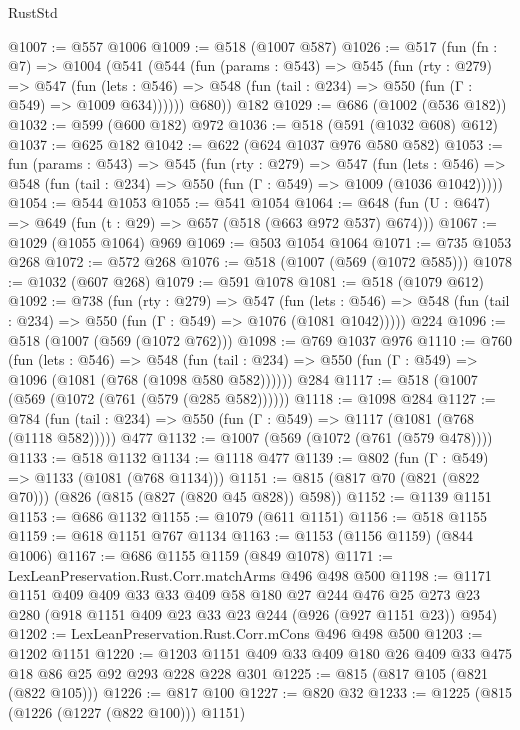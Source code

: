 \begin{lexlean}{RustStd}
\begin{coremodule}
@1007 := @557 @1006
@1009 := @518 (@1007 @587)
@1026 := @517
    (fun (fn : @7) =>
    @1004
      (@541
        (@544
          (fun (params : @543) =>
          @545
            (fun (rty : @279) =>
            @547
              (fun (lets : @546) =>
              @548 (fun (tail : @234) => @550 (fun (Γ : @549) => @1009 @634))))))
        @680))
    @182
@1029 := @686 (@1002 (@536 @182))
@1032 := @599 (@600 @182) @972
@1036 := @518 (@591 (@1032 @608) @612)
@1037 := @625 @182
@1042 := @622 (@624 @1037 @976 @580 @582)
@1053 := fun (params : @543) =>
  @545
    (fun (rty : @279) =>
    @547
      (fun (lets : @546) =>
      @548 (fun (tail : @234) => @550 (fun (Γ : @549) => @1009 (@1036 @1042)))))
@1054 := @544 @1053
@1055 := @541 @1054
@1064 := @648 (fun (U : @647) => @649 (fun (t : @29) => @657 (@518 (@663 @972 @537) @674)))
@1067 := @1029 (@1055 @1064) @969
@1069 := @503 @1054 @1064
@1071 := @735 @1053 @268
@1072 := @572 @268
@1076 := @518 (@1007 (@569 (@1072 @585)))
@1078 := @1032 (@607 @268)
@1079 := @591 @1078
@1081 := @518 (@1079 @612)
@1092 := @738
    (fun (rty : @279) =>
    @547
      (fun (lets : @546) =>
      @548 (fun (tail : @234) => @550 (fun (Γ : @549) => @1076 (@1081 @1042)))))
    @224
@1096 := @518 (@1007 (@569 (@1072 @762)))
@1098 := @769 @1037 @976
@1110 := @760
    (fun (lets : @546) =>
    @548 (fun (tail : @234) => @550 (fun (Γ : @549) => @1096 (@1081 (@768 (@1098 @580 @582))))))
    @284
@1117 := @518 (@1007 (@569 (@1072 (@761 (@579 (@285 @582))))))
@1118 := @1098 @284
@1127 := @784 (fun (tail : @234) => @550 (fun (Γ : @549) => @1117 (@1081 (@768 (@1118 @582))))) @477
@1132 := @1007 (@569 (@1072 (@761 (@579 @478))))
@1133 := @518 @1132
@1134 := @1118 @477
@1139 := @802 (fun (Γ : @549) => @1133 (@1081 (@768 @1134)))
@1151 := @815 (@817 @70 (@821 (@822 @70))) (@826 (@815 (@827 (@820 @45 @828)) @598))
@1152 := @1139 @1151
@1153 := @686 @1132
@1155 := @1079 (@611 @1151)
@1156 := @518 @1155
@1159 := @618 @1151 @767 @1134
@1163 := @1153 (@1156 @1159) (@844 @1006)
@1167 := @686 @1155 @1159 (@849 @1078)
@1171 := LexLeanPreservation.Rust.Corr.matchArms @496 @498 @500
@1198 := @1171
    @1151
    @409
    @409
    @33
    @33
    @409
    @58
    @180
    @27
    @244
    @476
    @25
    @273
    @23
    @280
    (@918 @1151 @409 @23 @33 @23 @244 (@926 (@927 @1151 @23)) @954)
@1202 := LexLeanPreservation.Rust.Corr.mCons @496 @498 @500
@1203 := @1202 @1151
@1220 := @1203 @1151 @409 @33 @409 @180 @26 @409 @33 @475 @18 @86 @25 @92 @293 @228 @228 @301
@1225 := @815 (@817 @105 (@821 (@822 @105)))
@1226 := @817 @100
@1227 := @820 @32
@1233 := @1225 (@815 (@1226 (@1227 (@822 @100))) @1151)

\end{coremodule}
\end{lexlean}
